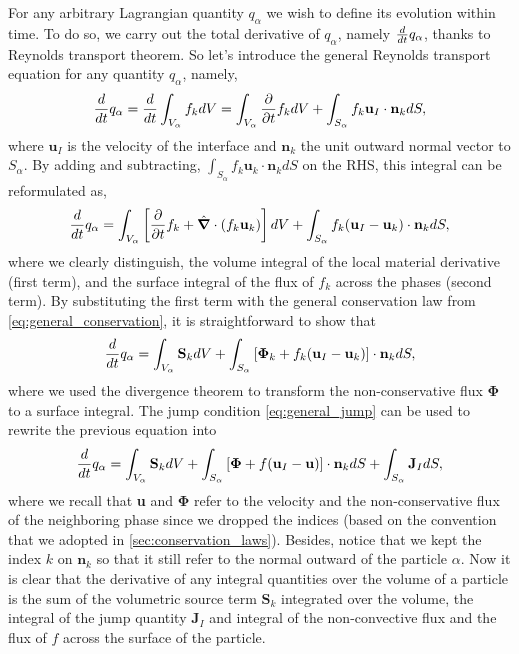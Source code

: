 For any arbitrary Lagrangian quantity $q_\alpha$ we wish to define its evolution within time. 
To do so, we carry out the total derivative of $q_\alpha$, namely $\frac{d}{d t} q_\alpha$, thanks to Reynolds transport theorem.
So let's introduce the general Reynolds transport equation for any quantity $q_\alpha$, namely, 
\begin{equation*}
    \frac{d}{d t}  q_\alpha 
    = \frac{d}{d t} \int_{V_\alpha} f_k dV 
    = \int_{V_\alpha} \frac{\partial}{\partial t} f_kdV 
    + \int_{S_\alpha} f_k \textbf{u}_I \cdot \textbf{n}_k d S,
\end{equation*}
where $\textbf{u}_I$ is the velocity of the interface and $\textbf{n}_k$ the unit outward normal vector to $S_\alpha$. 
By adding and subtracting, $\int_{S_\alpha} f_k \textbf{u}_k\cdot \textbf{n}_k dS$ on the RHS,  this integral can be reformulated as,
\begin{equation}
    \frac{d}{d t}  q_\alpha 
    = \int_{V_\alpha}\left[ \frac{\partial}{\partial t} f_k + \hat{\bm{\nabla}} \cdot\left(f_k\textbf{u}_k\right) \right]dV 
    + \int_{S_\alpha} f_k (\textbf{u}_I-\textbf{u}_k)\cdot \textbf{n}_k d S,
    \label{eq:q_alpha_dt}
\end{equation}
where we clearly distinguish, the volume integral of the local material derivative (first term), and the surface integral of the flux of $f_k$ across the phases (second term).
By substituting the first term with the general conservation law from \ref{eq:general_conservation}, it is straightforward to show that 
\begin{equation}
    \frac{d}{d t}  q_\alpha 
    = \int_{V_\alpha} \textbf{S}_k dV 
    + \int_{S_\alpha} \left[\bm{\Phi}_k + f_k (\textbf{u}_I-\textbf{u}_k) \right] \cdot \textbf{n}_k d S,
\end{equation}
where we used the divergence theorem to transform the non-conservative flux $\bm{\Phi}$ to a surface integral. 
The jump condition \ref{eq:general_jump} can be used to rewrite the previous equation into
\begin{equation}
    \frac{d}{d t}  q_\alpha 
    = \int_{V_\alpha} \textbf{S}_k dV 
    + \int_{S_\alpha} \left[\bm{\Phi} + f (\textbf{u}_I-\textbf{u}) \right] \cdot \textbf{n}_k d S
    + \int_{S_\alpha} \textbf{J}_I dS,
    \label{eq:q_alpha_balance}
\end{equation}
where we recall that \textbf{u} and $\bm{\Phi}$ refer to the velocity and the non-conservative flux of the neighboring phase since we dropped the indices (based on the convention that we adopted in \ref{sec:conservation_laws}). 
Besides, notice that we kept the index $k$ on $\textbf{n}_k$ so that it still refer to the normal outward of the particle $\alpha$. 
Now it is clear that the derivative of any integral quantities over the volume of a particle is the sum of the volumetric source term $\textbf{S}_k$ integrated over the volume, the integral of the jump quantity $\textbf{J}_I$ and integral of the non-convective flux and the flux of $f$ across the surface of the particle. 


